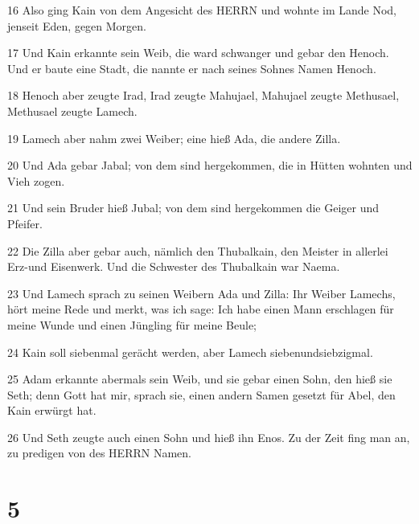 \par 16 Also ging Kain von dem Angesicht des HERRN und wohnte im Lande Nod, jenseit Eden, gegen Morgen.
\par 17 Und Kain erkannte sein Weib, die ward schwanger und gebar den Henoch. Und er baute eine Stadt, die nannte er nach seines Sohnes Namen Henoch.
\par 18 Henoch aber zeugte Irad, Irad zeugte Mahujael, Mahujael zeugte Methusael, Methusael zeugte Lamech.
\par 19 Lamech aber nahm zwei Weiber; eine hieß Ada, die andere Zilla.
\par 20 Und Ada gebar Jabal; von dem sind hergekommen, die in Hütten wohnten und Vieh zogen.
\par 21 Und sein Bruder hieß Jubal; von dem sind hergekommen die Geiger und Pfeifer.
\par 22 Die Zilla aber gebar auch, nämlich den Thubalkain, den Meister in allerlei Erz-und Eisenwerk. Und die Schwester des Thubalkain war Naema.
\par 23 Und Lamech sprach zu seinen Weibern Ada und Zilla: Ihr Weiber Lamechs, hört meine Rede und merkt, was ich sage: Ich habe einen Mann erschlagen für meine Wunde und einen Jüngling für meine Beule;
\par 24 Kain soll siebenmal gerächt werden, aber Lamech siebenundsiebzigmal.
\par 25 Adam erkannte abermals sein Weib, und sie gebar einen Sohn, den hieß sie Seth; denn Gott hat mir, sprach sie, einen andern Samen gesetzt für Abel, den Kain erwürgt hat.
\par 26 Und Seth zeugte auch einen Sohn und hieß ihn Enos. Zu der Zeit fing man an, zu predigen von des HERRN Namen.

\chapter{5}

